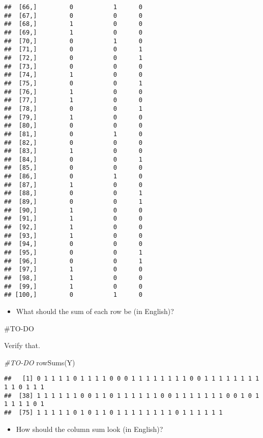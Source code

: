 \documentclass[
]{article}
\newenvironment{Shaded}{\begin{snugshade}}{\end{snugshade}}
\newcommand{\CommentTok}[1]{\textcolor[rgb]{0.56,0.35,0.01}{\textit{#1}}}
\newcommand{\FunctionTok}[1]{\textcolor[rgb]{0.00,0.00,0.00}{#1}}
\newcommand{\NormalTok}[1]{#1}
\providecommand{\tightlist}{%
  \setlength{\itemsep}{0pt}\setlength{\parskip}{0pt}}
\begin{document}
\begin{verbatim}
##  [66,]         0           1      0
##  [67,]         0           0      0
##  [68,]         1           0      0
##  [69,]         1           0      0
##  [70,]         0           1      0
##  [71,]         0           0      1
##  [72,]         0           0      1
##  [73,]         0           0      0
##  [74,]         1           0      0
##  [75,]         0           0      1
##  [76,]         1           0      0
##  [77,]         1           0      0
##  [78,]         0           0      1
##  [79,]         1           0      0
##  [80,]         0           0      0
##  [81,]         0           1      0
##  [82,]         0           0      0
##  [83,]         1           0      0
##  [84,]         0           0      1
##  [85,]         0           0      0
##  [86,]         0           1      0
##  [87,]         1           0      0
##  [88,]         0           0      1
##  [89,]         0           0      1
##  [90,]         1           0      0
##  [91,]         1           0      0
##  [92,]         1           0      0
##  [93,]         1           0      0
##  [94,]         0           0      0
##  [95,]         0           0      1
##  [96,]         0           0      1
##  [97,]         1           0      0
##  [98,]         1           0      0
##  [99,]         1           0      0
## [100,]         0           1      0
\end{verbatim}

\begin{itemize}
\tightlist
\item
  What should the sum of each row be (in English)?
\end{itemize}

\#TO-DO

Verify that.

\begin{Shaded}
\begin{Highlighting}[]
\CommentTok{\#TO{-}DO}
\FunctionTok{rowSums}\NormalTok{(Y)}
\end{Highlighting}
\end{Shaded}

\begin{verbatim}
##   [1] 0 1 1 1 1 0 1 1 1 1 0 0 0 1 1 1 1 1 1 1 1 0 0 1 1 1 1 1 1 1 1 1 1 0 1 1 1
##  [38] 1 1 1 1 1 1 0 0 1 1 0 1 1 1 1 1 1 0 0 1 1 1 1 1 1 1 0 0 1 0 1 1 1 1 1 0 1
##  [75] 1 1 1 1 1 0 1 0 1 1 0 1 1 1 1 1 1 1 1 0 1 1 1 1 1 1
\end{verbatim}

\begin{itemize}
\tightlist
\item
  How should the column sum look (in English)?
\end{itemize}
\end{document}
